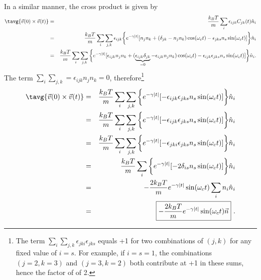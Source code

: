 In a similar manner, the cross product is given by
\begin{eqnarray}
\tavg{\vec{v}(0) \times \vec{v}(t)} &=& \frac{k_B T}{m} \sum_{i} \epsilon_{ijk} C_{jk}(t) \hat{n}_i \nonumber \\
&=& \frac{k_B T}{m} \sum_{i} \sum_{j, k} \epsilon_{ijk} \bigg\{ e^{-\gamma |t|} [ n_j n_k + (\delta_{jk} - n_j n_k) \cos(\omega_c t) - \epsilon_{jks} n_s \sin(\omega_c t)]\bigg\} \hat{n}_i \nonumber \\
&=& \frac{k_B T}{m} \sum_{i} \sum_{j, k} \bigg\{ e^{-\gamma |t|} [ \epsilon_{ijk} n_j n_k + (\underbrace{\epsilon_{ijk} \delta_{jk}}_{=0} -\epsilon_{ijk} n_j n_k) \cos(\omega_c t) - \epsilon_{ijk} \epsilon_{jks} n_s \sin(\omega_c t)]\bigg\}\hat{n}_i \nonumber.
\end{eqnarray}
The term $\sum_{i} \sum_{j, k} = \epsilon_{ijk} n_j n_k = 0$, therefore\footnote{The term $\sum_{i} \sum_{j, k} \epsilon_{jki} \epsilon_{jks}$ equals +1 for two combinations of $(j, k)$ for any fixed value of $i=s$. For example, if $i=s=1$, the combinations $(j=2, k=3)$ and $(j=3, k=2)$ both contribute at +1 in these sums, hence the factor of of 2. }
\begin{eqnarray}
\tavg{\vec{v}(0) \times \vec{v}(t)} &=& \frac{k_B T}{m} \sum_{i} \sum_{j, k} \bigg\{ e^{-\gamma |t|} [-\epsilon_{ijk} \epsilon_{jks} n_s \sin(\omega_c t)]\bigg\}\hat{n}_i \nonumber \\
&=& \frac{k_B T}{m} \sum_{i} \sum_{j, k} \bigg\{ e^{-\gamma |t|} [-\epsilon_{ijk} \epsilon_{jks} n_s \sin(\omega_c t)]\bigg\}\hat{n}_i \\
&=& \frac{k_B T}{m} \sum_{i} \sum_{j, k} \bigg\{ e^{-\gamma |t|} [-\epsilon_{jki} \epsilon_{jks} n_s \sin(\omega_c t)]\bigg\}\hat{n}_i \nonumber \\
&=& \frac{k_B T}{m} \sum_{i}\bigg\{ e^{-\gamma |t|} [-2 \delta_{is} n_s \sin(\omega_c t)]\bigg\}\hat{n}_i \nonumber \\
&=& -\frac{2k_B T}{m} e^{-\gamma |t|} \sin(\omega_c t) \sum_{i} n_i \hat{n}_i \nonumber \\
&=& \boxed{-\frac{2k_B T}{m} e^{-\gamma |t|}\sin(\omega_c t) \vec{n}}~.
\end{eqnarray}